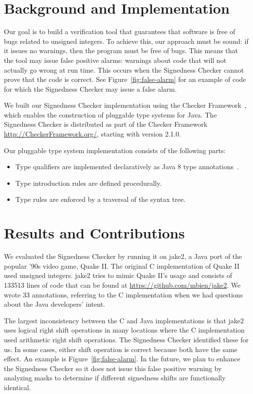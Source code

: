 \documentclass{sig-alternate-05-2015}
\begin{document}
\section{Background and Implementation}

Our goal is to build a verification tool that guarantees that software is
free of bugs related to unsigned integers. To achieve this, our approach
must be sound:  if it issues no warnings, then the program must be free of
bugs.
This means that the tool may issue false positive alarms:  warnings about
code that will not actually go wrong at run time.  This occurs when the
Signedness Checker cannot prove that the code is correct. See Figure~\ref{fig:false-alarm}
for an example of code for which the Signedness Checker may issue a false alarm.

We built our Signedness Checker implementation using the
Checker Framework~\cite{PapiACPE2008,DietlDEMS2011}, which enables the
construction of pluggable type systems for Java.
The Signedness Checker is distributed as part of the Checker Framework
\url{http://CheckerFramework.org/}, starting with version 2.1.0.

Our pluggable type system implementation consists of the following parts:

\begin{itemize}\itemsep 0pt \parskip 0pt
  \item Type qualifiers are implemented declaratively as Java 8 type
    annotations~\cite{JSR308-PFD}.
  \item Type introduction rules are defined procedurally.
  \item Type rules are enforced by a traversal of the syntax tree.
\end{itemize}

\section{Results and Contributions}

We evaluated the Signedness Checker by running it on jake2, a Java
port of the popular '90s video game, Quake II\@.  The original C
implementation of Quake II used unsigned integers. jake2
tries to mimic Quake II's usage and consists of 133513 lines of code that
can be found at \url{https://github.com/mbien/jake2}.
We wrote 33 annotations, referring to the
C implementation when we had questions about the Java developers' intent.

The largest inconsistency between the C and Java implementations is that
jake2 uses logical right shift operations
in many locations where the C implementation used arithmetic right shift
operations.  The Signedness Checker identified these for us.
In some cases, either shift operation is correct because both have the same
effect.  An example is Figure~\ref{fig:false-alarm}.  In the future, we
plan to enhance the Signedness Checker so it does not issue this false
positive warning by analyzing masks to determine if different signedness shifts
are functionally identical.
\end{document}

